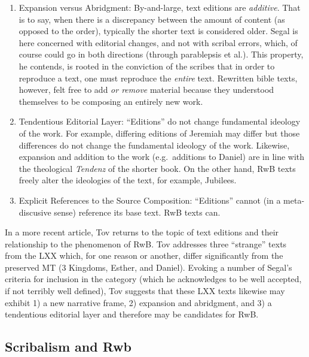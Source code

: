 \begin{enumerate}
\def\labelenumi{\arabic{enumi}.}
\setcounter{enumi}{3}
\item
  Expansion versus Abridgment: By-and-large, text editions are
  \emph{additive}. That is to say, when there is a discrepancy between
  the amount of content (as opposed to the order), typically the shorter
  text is considered older. Segal is here concerned with editorial
  changes, and not with scribal errors, which, of course could go in
  both directions (through parablepsis et al.). This property, he
  contends, is rooted in the conviction of the scribes that in order to
  reproduce a text, one must reproduce the \emph{entire}
  text.\autocite[24]{segal_henze2005} Rewritten bible texts, however,
  felt free to add \emph{or remove} material because they understood
  themselves to be composing an entirely new
  work.\autocite[24]{segal_henze2005}
\item
  Tendentious Editorial Layer: ``Editions'' do not change fundamental
  ideology of the work. For example, differing editions of Jeremiah may
  differ but those differences do not change the fundamental ideology of
  the work. Likewise, expansion and addition to the work (e.g.~additions
  to Daniel) are in line with the theological \emph{Tendenz} of the
  shorter book. On the other hand, RwB texts freely alter the ideologies
  of the text, for example, Jubilees.\autocite[25]{segal_henze2005}
\item
  Explicit References to the Source Composition: ``Editions'' cannot (in
  a meta-discusive sense) reference its base text. RwB texts can.
\end{enumerate}

In a more recent article, Tov returns to the topic of text editions and
their relationship to the phenomenon of
RwB\autocite{tov_krarrer-kraus2008}. Tov addresses three ``strange''
texts from the LXX which, for one reason or another, differ
significantly from the preserved MT (3 Kingdoms, Esther, and Daniel).
Evoking a number of Segal's criteria\autocite{segal_henze2005} for
inclusion in the category (which he acknowledges to be well accepted, if
not terribly well defined), Tov suggests that these LXX texts likewise
may exhibit 1) a new narrative frame, 2) expansion and abridgment, and
3) a tendentious editorial layer and therefore may be candidates for
RwB.

\subsection{Scribalism and Rwb}\label{scribalism-and-rwb}

